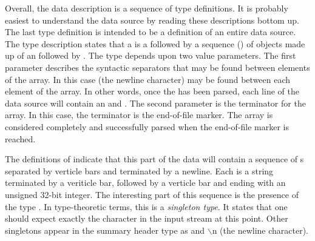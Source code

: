 \documentclass{entcs}
\begin{document}
Overall, the \datatype{} data
description is a sequence of type definitions.
It is probably easiest to understand the data source by
reading these descriptions bottom up.
The last type definition  is intended to be
a definition of an entire \dibbler{} data source.  The
type description states that a  is a
 followed by a sequence () of objects
made up of an  followed by .
The  type depends upon two value parameters.
The first parameter describes the syntactic separators 
that may be found between elements of the array.  In this
case  (the newline character) may be found between
each element of the array.  In other words, once 
the  has been parsed, each line
of the data source will contain an 
 and .  The second parameter
is the terminator for the array.  In this case,
the terminator is the end-of-file marker.  The array
is considered completely and successfully parsed when 
the end-of-file marker is reached.


% 

The definitions of  indicate that
this part of the \dibbler{} data will contain a sequence
of s separated by verticle bars and terminated by a newline.
Each  is a string terminated by a veriticle bar,
followed by a verticle bar and ending with an unsigned
32-bit integer.  The interesting part of this sequence is the
presence of the type .  In type-theoretic terms, this is
a {\em singleton type}.  It states that one should
 expect exactly the character  in the input stream at this point.
Other singletons appear in the summary header type as 
and $\backslash$n (the newline character).
\end{document}
